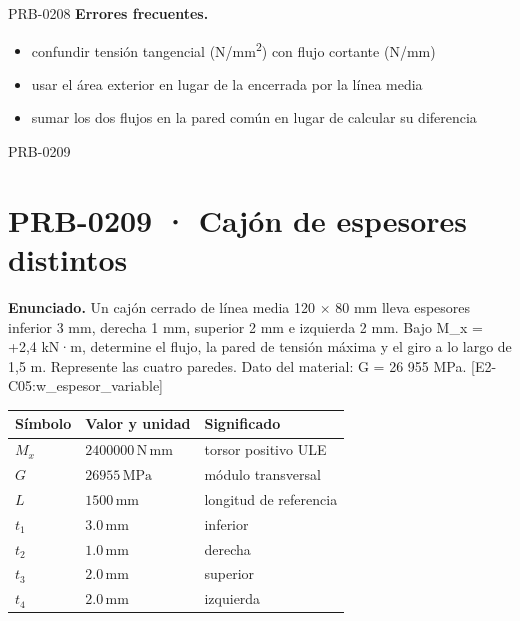 \begin{studiumworked}{PRB-0208}
\textbf{Errores frecuentes.}\begin{itemize}\item confundir tensión tangencial (N/mm\textsuperscript{2}) con flujo cortante (N/mm)
\item usar el área exterior en lugar de la encerrada por la línea media
\item sumar los dos flujos en la pared común en lugar de calcular su diferencia\end{itemize}

\end{studiumworked}

\Needspace{.3\textheight}

\begin{studiumworked}{PRB-0209}

\section{PRB-0209 · Cajón de espesores distintos}

\textbf{Enunciado.} Un cajón cerrado de línea media 120 \ensuremath{\times} 80 mm lleva espesores inferior 3 mm, derecha 1 mm, superior 2 mm e izquierda 2 mm. Bajo M\_x = +2,4 kN·m, determine el flujo, la pared de tensión máxima y el giro a lo largo de 1,5 m. Represente las cuatro paredes. Dato del material: G = 26 955 MPa. [E2-C05:w\_espesor\_variable]

\par\medskip\noindent\begin{tabular}{@{}p{.18\linewidth}p{.26\linewidth}p{.48\linewidth}@{}}
\toprule Símbolo & Valor y unidad & Significado\\\midrule
$M_{x}$ & $2400000\,\mathrm{N\,mm}$ & torsor positivo ULE\\
$G$ & $26955\,\mathrm{MPa}$ & módulo transversal\\
$L$ & $1500\,\mathrm{mm}$ & longitud de referencia\\
$t_{1}$ & $3.0\,\mathrm{mm}$ & inferior\\
$t_{2}$ & $1.0\,\mathrm{mm}$ & derecha\\
$t_{3}$ & $2.0\,\mathrm{mm}$ & superior\\
$t_{4}$ & $2.0\,\mathrm{mm}$ & izquierda\\
\bottomrule\end{tabular}\par\medskip


\end{studiumworked}
